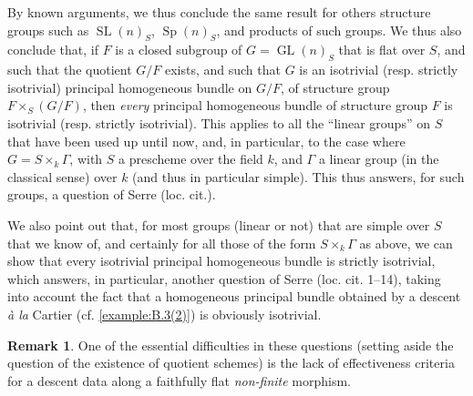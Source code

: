 \documentclass{article}
\theoremstyle{plain}
\theoremstyle{definition}
\newtheorem*{remark*}{Remark}
\DeclareMathOperator{\GL}{GL}
\DeclareMathOperator{\SL}{SL}
\DeclareMathOperator{\Sp}{Sp}
\begin{document}
By known arguments, we thus conclude the same result for others structure groups such as $\SL(n)_S$, $\Sp(n)_S$, and products of such groups.
We thus also conclude that, if $F$ is a closed subgroup of $G=\GL(n)_S$ that is flat over $S$, and such that the quotient $G/F$ exists, and such that $G$ is an isotrivial (resp. strictly isotrivial) principal homogeneous bundle on $G/F$, of structure group $F\times_S(G/F)$, then \emph{every} principal homogeneous bundle of structure group $F$ is isotrivial (resp. strictly isotrivial).
This applies to all the ``linear groups'' on $S$ that have been used up until now, and, in particular, to the case where $G=S\times_k\Gamma$, with $S$ a prescheme over the field $k$, and $\Gamma$ a linear group (in the classical sense) over $k$ (and thus in particular simple).
This thus answers, for such groups, a question of Serre (loc. cit.).

We also point out that, for most groups (linear or not) that are simple over $S$ that we know of, and certainly for all those of the form $S\times_k\Gamma$ as above, we can show that every isotrivial principal homogeneous bundle is strictly isotrivial, which answers, in particular, another question of Serre (loc. cit. 1--14), taking into account the fact that a homogeneous principal bundle obtained by a descent \emph{\`{a} la} Cartier (cf. \cref{example:B.3(2)}) is obviously isotrivial.

\begin{remark*}
  One of the essential difficulties in these questions (setting aside the question of the existence of quotient schemes) is the lack of effectiveness criteria for a descent data along a faithfully flat \emph{non-finite} morphism.
\end{remark*}




\end{document}
